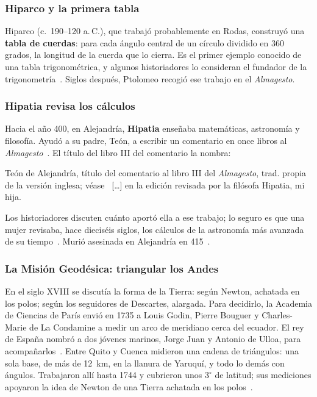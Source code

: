 \documentclass[11pt]{article}
\begin{document}
\subsubsection*{Hiparco y la primera tabla}

Hiparco (c.~190--120 a.\,C.), que trabajó probablemente en Rodas, construyó una
\textbf{tabla de cuerdas}: para cada ángulo central de un círculo dividido en
$360$ grados, la longitud de la cuerda que lo cierra. Es el primer ejemplo
conocido de una tabla trigonométrica, y algunos historiadores lo consideran el
fundador de la trigonometría~\cite{mactutorhiparco}. Siglos después, Ptolomeo
recogió ese trabajo en el \emph{Almagesto}.

\subsubsection*{Hipatia revisa los cálculos}

Hacia el año 400, en Alejandría, \textbf{Hipatia} enseñaba matemáticas,
astronomía y filosofía. Ayudó a su padre, Teón, a escribir un comentario en
once libros al \emph{Almagesto}~\cite{mactutorhipatia}. El título del libro III
del comentario la nombra:

\begin{cita}{Teón de Alejandría, título del comentario al libro III del \emph{Almagesto}, trad. propia de la versión inglesa; véase~\cite{cameron1990}}
[\ldots] en la edición revisada por la filósofa Hipatia, mi hija.
\end{cita}

Los historiadores discuten cuánto aportó ella a ese trabajo; lo seguro es que
una mujer revisaba, hace dieciséis siglos, los cálculos de la astronomía más
avanzada de su tiempo~\cite{cameron1990}. Murió asesinada en Alejandría en
415~\cite{mactutorhipatia}.

\subsubsection*{La Misión Geodésica: triangular los Andes}

En el siglo XVIII se discutía la forma de la Tierra: según Newton, achatada en
los polos; según los seguidores de Descartes, alargada. Para decidirlo, la
Academia de Ciencias de París envió en 1735 a Louis Godin, Pierre Bouguer y
Charles-Marie de La Condamine a medir un arco de meridiano cerca del ecuador.
El rey de España nombró a dos jóvenes marinos, Jorge Juan y Antonio de Ulloa,
para acompañarlos~\cite{mactutorlacondamine, mactutorjuan}. Entre Quito y
Cuenca midieron una cadena de triángulos: una sola base, de más de 12~km, en la
llanura de Yaruquí, y todo lo demás con ángulos. Trabajaron allí hasta 1744 y
cubrieron unos $3^\circ$ de latitud; sus mediciones apoyaron la idea de Newton
de una Tierra achatada en los polos~\cite{mactutorjuan}.
\end{document}
